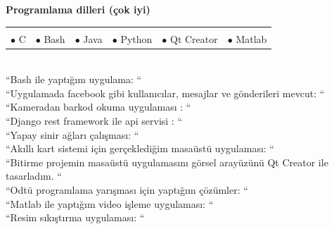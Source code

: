 \documentclass[10pt,a4paper]{article}
\begin{document}
{\bf Programlama dilleri (çok iyi)}\\
\hspace*{0.3in}\begin{tabular}{lrrrrr}
\vspace{0.5 mm}\\
  $\bullet$ C &$\bullet$ Bash &$\bullet$ Java &$\bullet$ Python &$\bullet$ Qt Creator &$\bullet$ Matlab\\
\end{tabular}
\vspace{0.5 mm}\\
\hspace*{0.6in}\footnotesize{``Bash ile yaptığım uygulama: ``}\\
\hspace*{0.6in}\footnotesize{``Uygulamada facebook gibi kullanıcılar, mesajlar ve gönderileri mevcut: ``}\\
\hspace*{0.6in}\footnotesize{``Kameradan barkod okuma uygulaması : ``}\\
\hspace*{0.6in}\footnotesize{``Django rest framework ile api servisi : ``}\\
\hspace*{0.6in}\footnotesize{``Yapay sinir ağları çalışması: ``}\\
\hspace*{0.6in}\footnotesize{``Akıllı kart sistemi için gerçeklediğim masaüstü uygulaması: ``}\\
\hspace*{0.6in}\footnotesize{``Bitirme projemin masaüstü uygulamasını görsel arayüzünü Qt Creator ile tasarladım. ``}\\
\hspace*{0.6in}\footnotesize{``Odtü programlama yarışması için yaptığım çözümler: ``}\\
\hspace*{0.6in}\footnotesize{``Matlab ile yaptığım video işleme uygulaması: ``}\\
\hspace*{0.6in}\footnotesize{``Resim sıkıştırma uygulaması: ``}\\
\end{document}
